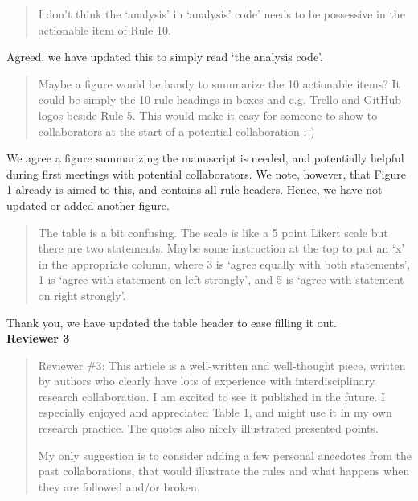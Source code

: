 \documentclass[a4paper]{article}
\begin{document}
\begin{quote}
    I don’t think the `analysis' in `analysis' code' needs to be possessive in the actionable item of Rule 10.

\end{quote}

Agreed, we have updated this to simply read `the analysis code'.

\begin{quote}
    
Maybe a figure would be handy to summarize the 10 actionable items? It could be simply the 10 rule headings in boxes and e.g. Trello and GitHub logos beside Rule 5. This would make it easy for someone to show to collaborators at the start of a potential collaboration :-)

\end{quote}

We agree a figure summarizing the manuscript is needed, and potentially helpful during first meetings with potential collaborators. We note, however, that Figure 1 already is aimed to this, and contains all rule headers. Hence, we have not updated or added another figure.

\begin{quote}
    
The table is a bit confusing. The scale is like a 5 point Likert scale but there are two statements. Maybe some instruction at the top to put an `x' in the appropriate column, where 3 is `agree equally with both statements', 1 is `agree with statement on left strongly', and 5 is `agree with statement on right strongly'.

\end{quote}

Thank you, we have updated the table header to ease filling it out.\\


\textbf{Reviewer 3}

\begin{quote}
    Reviewer \#3: This article is a well-written and well-thought piece, written by authors who clearly have lots of experience with interdisciplinary research collaboration. I am excited to see it published in the future. I especially enjoyed and appreciated Table 1, and might use it in my own research practice. The quotes also nicely illustrated presented points.

My only suggestion is to consider adding a few personal anecdotes from the past collaborations, that would illustrate the rules and what happens when they are followed and/or broken.
\end{quote}
\end{document}
